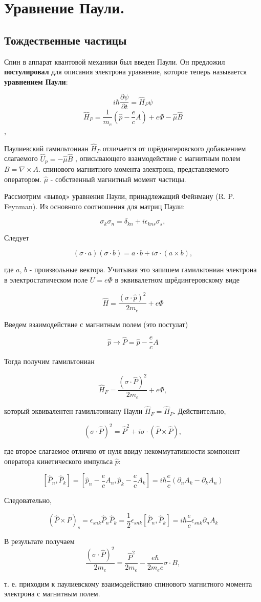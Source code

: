 \section {Уравнение Паули.}
\subsection {Тождественные частицы}
Спин в аппарат квантовой механики был введен Паули. Он
предложил \textbf{постулировал} для описания электрона уравнение,
которое теперь называется \textbf{уравнением Паули}:


$$ i\hbar\frac{\partial\psi}{\partial t}=\hat{H}_P\psi$$
$$ \hat{H}_P = \frac{1}{m_e} \left( \hat{p} - \frac{e}{c}A \right) + e\Phi - \hat \mu \hat B$$, 

Паулиевский гамильтониан $\hat{H}_P $ отличается от шрёдингеровского
добавлением слагаемого $\hat U_p = - \hat \mu \hat B$
, описывающего взаимодействие с магнитным полем
$B = \nabla \times A$.
спинового магнитного момента
электрона, представляемого оператором.
$\hat \mu$ - собственный магнитный момент частицы.

Рассмотрим «вывод» уравнения Паули, принадлежащий
Фейнману (R. P. Feynman). Из основного соотношения для матриц
Паули:

$$\sigma_k \sigma_n = \delta_{kn} + i \epsilon_{kns} \sigma_{s},$$

Следует

$$(\sigma \cdot a) (\sigma \cdot b) = a \cdot b + i \sigma \cdot (a \times b),$$

где $a$, $b$ - произвольные вектора. Учитывая это запишем гамильтониан электрона в электростатическом поле $U = e \Phi$ в эквивалетном шрёдингеровскому виде


$$ \hat{H} = \frac{(\sigma \cdot \hat p)^2} {2m_e} + e\Phi$$

Введем взаимодействие с магнитным полем (это постулат)

$$\hat p \rightarrow \hat P = \hat p  - \frac{e}{c} A$$

Тогда получим гамильтониан


$$ \hat{H}_F = \frac{(\sigma \cdot \hat P)^2} {2m_e} + e\Phi, $$

который эквивалентен гамильтониану Паули $\hat H_F = \hat H_P$. Действительно, 

$$ (\sigma \cdot \hat P)^2 = \hat P^2 + i \sigma \cdot (\hat P \times \hat P),$$

где второе слагаемое отлично от нуля ввиду некоммутативности
компонент оператора кинетического импульса $\hat p$:

$$\left[ \hat P_n, \hat P_k \right] = [\hat p_n - \frac{e}{c}A_n, \hat p_k - \frac{e}{c}A_k] = i \hbar \frac{e}{c}(\partial_n A_k - \partial_k A_n)$$

Следовательно,

$$(\hat P \times \hat P)_s = \epsilon_{snk}\hat P_n \hat P_k = \frac{1}{2} \epsilon_{snk} [\hat P_n, \hat P_k] = i \hbar \frac{e}{c} \epsilon_{snk} \partial_n A_k$$ 

В результате получаем 
$$\frac{(\sigma \cdot \hat P)^2}{2m_e} = \frac{\hat P^2}{2m_e} - \frac{e \hbar}{2m_e c} \sigma \cdot B,$$

т. е. приходим к паулиевскому взаимодействию спинового
магнитного момента электрона с магнитным полем.